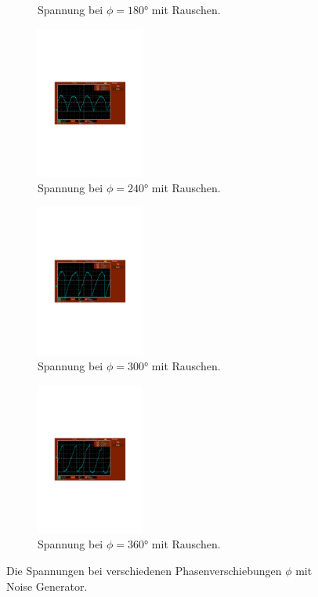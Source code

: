 \begin{figure}
\begin{subfigure}{0.48\textwidth}
      \caption{Spannung bei $\phi = 180°$ mit Rauschen.}
  \end{subfigure}
\hfill 
  \begin{subfigure}{0.48\textwidth}
      \centering
      \includegraphics[height=5cm]{content/abbildungen/mit/240.pdf}
      \caption{Spannung bei $\phi = 240°$ mit Rauschen.}
  \end{subfigure}
\hfill 
  \begin{subfigure}{0.48\textwidth}
      \centering
      \includegraphics[height=5cm]{content/abbildungen/mit/300.pdf}
      \caption{Spannung bei $\phi = 300°$ mit Rauschen.}
  \end{subfigure}
\hfill 
  \begin{subfigure}{0.48\textwidth}
      \centering
      \includegraphics[height=5cm]{content/abbildungen/mit/360.pdf}
      \caption{Spannung bei $\phi = 360°$ mit Rauschen.}
  \end{subfigure}
\caption{Die Spannungen bei verschiedenen Phasenverschiebungen $\phi$ mit Noise Generator.}
\end{figure}

